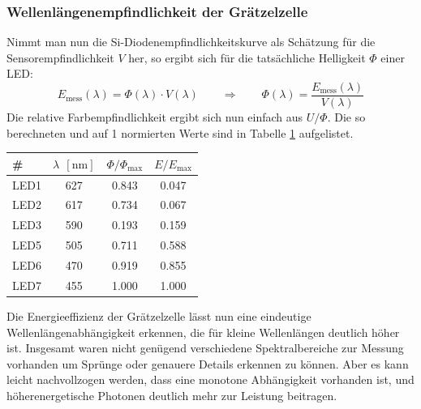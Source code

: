 \documentclass[11pt]{scrartcl}
\newcommand{\unit}[1]{\ensuremath{\,\mathrm{#1}}} %
\begin{document}
\subsubsection{Wellenlängenempfindlichkeit der Grätzelzelle}
Nimmt man nun die Si-Diodenempfindlichkeitskurve als Schätzung für die Sensorempfindlichkeit $V$ her, so ergibt sich für die tatsächliche Helligkeit $\Phi$ einer LED:
\[
E_{\text{mess}}(\lambda) = \Phi(\lambda)\cdot V(\lambda)
\qquad\Rightarrow\qquad
\Phi(\lambda) = \frac{E_{\text{mess}}(\lambda)}{V(\lambda)}
\]
Die relative Farbempfindlichkeit ergibt sich nun einfach aus $U/\Phi$. Die so berechneten und auf 1 normierten Werte sind in Tabelle \ref{lambda_kurve} aufgelistet.
\begin{table}[ht]
\label{lambda_kurve}
\begin{center}
\begin{tabular}{l|ccc}
\# &
$\lambda\; \unit{[nm]}$ &
$\Phi / \Phi_{\text{max}}$ &
$E/E_{\text{max}}$ \\
\hline
LED1	& 627	& 0.843	& 0.047 \\
LED2	& 617	& 0.734	& 0.067 \\
LED3	& 590	& 0.193	& 0.159 \\
LED5	& 505	& 0.711	& 0.588 \\
LED6	& 470	& 0.919	& 0.855 \\
LED7	& 455	& 1.000	& 1.000
\end{tabular}
\end{center}
\end{table}
Die Energieeffizienz der Grätzelzelle lässt nun eine eindeutige Wellenlängenabhängigkeit erkennen, die für kleine Wellenlängen deutlich höher ist. Insgesamt waren nicht genügend verschiedene Spektralbereiche zur Messung vorhanden um Sprünge oder genauere Details erkennen zu können. Aber es kann leicht nachvollzogen werden, dass eine monotone Abhängigkeit vorhanden ist, und höherenergetische Photonen deutlich mehr zur Leistung beitragen.
\end{document}
